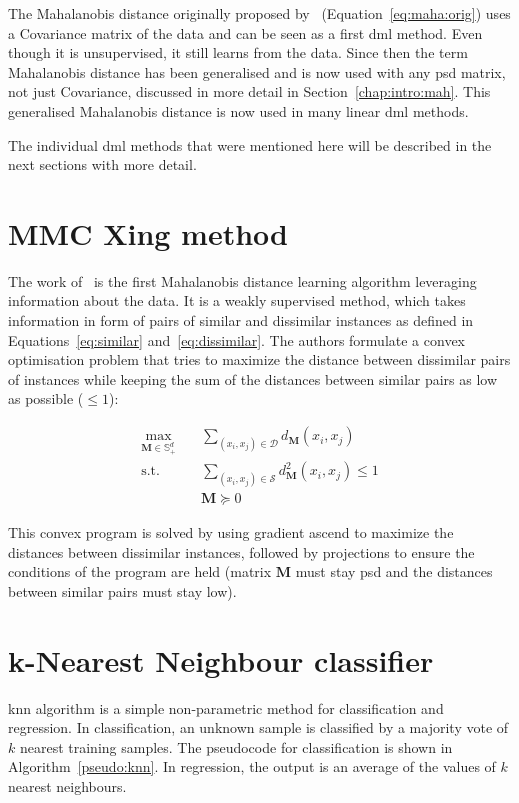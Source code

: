 The Mahalanobis distance originally proposed by~\citep{mahalanobis1936generalized} (Equation~\ref{eq:maha:orig}) uses a Covariance matrix of the data and can be seen as a first \ac{dml} method. Even though it is unsupervised, it still learns from the data. Since then the term Mahalanobis distance has been generalised and is now used with any \ac{psd} matrix, not just Covariance, discussed in more detail in Section~\ref{chap:intro:mah}. This generalised Mahalanobis distance is now used in many linear \ac{dml} methods.

The individual \ac{dml} methods that were mentioned here will be described in the next sections with more detail.

\section{MMC Xing method} \label{chap:rw:xing}
The work of~\citep{xing2002distance} is the first Mahalanobis distance learning algorithm leveraging information about the data. It is a weakly supervised method, which takes information in form of pairs of similar and dissimilar instances as defined in Equations~\ref{eq:similar} and~\ref{eq:dissimilar}. The authors formulate a convex optimisation problem that tries to maximize the distance between dissimilar pairs of instances while keeping the sum of the distances between similar pairs as low as possible ($\leq 1$):

\begin{align*}
\max_{\bm{M} \in \mathbb{S}^{d}_+} \quad & \sum_{(x_i,x_j)\in \mathcal{D}} d_{\bm{M}}(x_i,x_j) \\
\text{s.t.} \quad & \sum_{(x_i,x_j)\in \mathcal{S}} d_{\bm{M}}^2(x_i,x_j) \leq 1 \\
& \bm{M} \succeq 0
\end{align*}

This convex program is solved by using gradient ascend to maximize the distances between dissimilar instances, followed by projections to ensure the conditions of the program are held (matrix $\bm{M}$ must stay \ac{psd} and the distances between similar pairs must stay low).

\section{k-Nearest Neighbour classifier} \label{alg:knn}

\ac{knn} algorithm is a simple non-parametric method for classification and regression. In classification, an unknown sample is classified by a majority vote of $k$ nearest training samples. The pseudocode for classification is shown in Algorithm~\ref{pseudo:knn}. In regression, the output is an average of the values of $k$ nearest neighbours.

